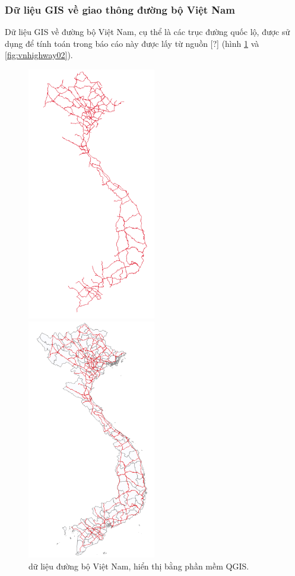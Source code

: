 \documentclass[14pt, oneside, a4paper, openany]{scrartcl}
\begin{document}
\subsubsection{Dữ liệu GIS về giao thông đường bộ Việt Nam}
Dữ liệu GIS về đường bộ Việt Nam, cụ thể là các trục đường quốc lộ, được sử dụng để tính toán trong báo cáo này được lấy từ nguồn [?] (hình \ref{fig:vnhighway01} và \ref{fig:vnhighway02}).
\begin{figure}
	\centering
	\begin{minipage}{0.6\textwidth}
		\centering
		\includegraphics[width=0.5\textwidth]{figures/vietnamroad.png} %
		\caption[dữ liệu đường bộ Việt Nam]{dữ liệu đường bộ Việt Nam, hiển thị bằng phần mềm QGIS.}
		\label{fig:vnhighway01}
	\end{minipage}\hfill
	\begin{minipage}{0.6\textwidth}
		\centering
		\includegraphics[width=0.5\textwidth]{figures/vietnamroad03.png} %

\end{minipage}
\end{figure}
\end{document}
